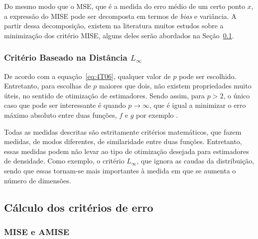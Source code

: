 Do mesmo modo que o \ac{MSE}, que é a medida do erro médio de um certo ponto $x$, a expressão do MISE pode ser decomposta em termos de \emph{bias} e variância. A partir dessa decomposição, existem na literatura muitos estudos sobre a minimização dos critério MISE, alguns deles serão abordados na Seção~\ref{sec:amise}.

\subsubsection{Critério Baseado na Distância ${L_\infty }$}

De acordo com a equação~\ref{eq:4T06}, qualquer valor de $p$ pode ser escolhido. Entretanto, para escolhas de $p$ maiores que dois, não existem propriedades muito úteis, no sentido de otimização de estimadores. Sendo assim, para $p > 2$, o único caso que pode ser interessante é quando $p \to \infty $, que é igual a minimizar o erro máximo absoluto entre duas funções, $f$ e $g$ por exemplo \cite{kernelthesis}.

Todas as medidas descritas são estritamente critérios matemáticos, que fazem medidas, de modos diferentes, de similaridade entre duas funções. Entretanto, essas medidas podem não levar ao tipo de otimização desejada para estimadores de densidade. Como exemplo, o critério ${L_\infty }$, que ignora as caudas da distribuição, sendo que essas tornam-se mais importantes à medida em que se aumenta o número de dimensões.

\subsection{Cálculo dos critérios de erro}\label{sec:amise}


\subsubsection{MISE e AMISE}\label{sec:fixed}

%
%

